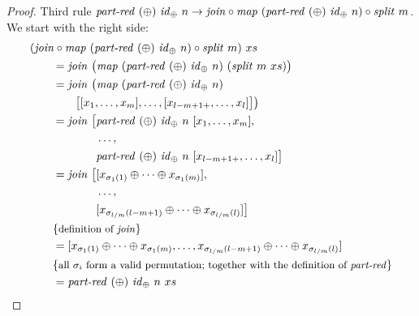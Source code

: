 \begin{proof}
  Third rule $\partRed\ (\oplus)\ \id_\oplus\ n \rightarrow \join \circ \map\ (\partRed\ (\oplus)\ \id_\oplus\ n) \circ \splitN\ m$.
  We start with the right side:
  \begin{align*}
    &(\join \circ \map\ (\partRed\ (\oplus)\ \id_\oplus\ n) \circ \splitN\ m)\ xs\\
    &\qquad = \join\ \big(\map\ (\partRed\ (\oplus)\ \id_\oplus\ n)\ (\splitN\ m\ xs)\big)\\
    &\qquad = \join\ \big(\map\ (\partRed\ (\oplus)\ \id_\oplus\ n)\\
    &\qquad\qquad \big[[x_1, \ldots, x_m], \ldots, [x_{l-m+1+}, \ldots, x_l]\big]\big)\\
    &\qquad = \join\
      \begin{aligned}[t]
        \big[&\partRed\ (\oplus)\ \id_\oplus\ n\ [x_1, \ldots, x_m],\\
             &\ldots,\\
             &\partRed\ (\oplus)\ \id_\oplus\ n\ [x_{l-m+1+}, \ldots, x_l]\big]
      \end{aligned}\\
    &\qquad = \join\
      \begin{aligned}[t]
        \big[&[x_{\sigma_1(1)} \oplus \dots \oplus x_{\sigma_1(m)}],\\
             &\ldots,\\
             &[x_{\sigma_{l/m}(l-m+1)} \oplus \dots \oplus x_{\sigma_{l/m}(l)}]\big]
      \end{aligned}\\
    &\qquad \comment{definition of \join}\\
    &\qquad = [x_{\sigma_1(1)} \oplus \dots \oplus x_{\sigma_1(m)}, \ldots, x_{\sigma_{l/m}(l-m+1)} \oplus \dots \oplus x_{\sigma_{l/m}(l)}]\\
    &\qquad \comment{all $\sigma_i$ form a valid permutation; together with the definition of \partRed}\\
    &\qquad = \partRed\ (\oplus)\ \id_\oplus\ n\ xs
  \end{align*}
\end{proof}
